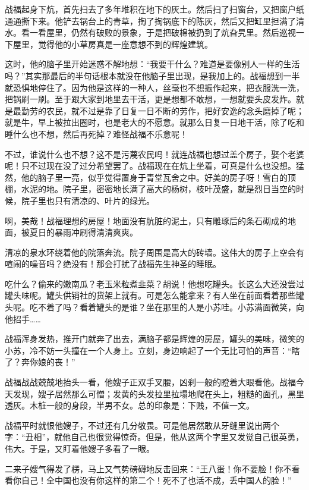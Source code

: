 战福起身下炕，首先扫去了多年堆积在地下的灰土。然后扫了扫窗台，又把窗户纸通通撕下来。他铲去锅台上的青草，掏了掏锅底下的陈灰，然后又把缸里担满了清水。看一看屋里，仍然有破败的景象，于是把破棉被扔到了炕旮旯里。然后巡视一下屋里，觉得他的小草房真是一座意想不到的辉煌建筑。 

这时，他的脑子里开始迷惑不解地想：“我要干什么？难道是要像别人一样的生活吗？”其实那最后的半句话根本就没在他脑子里出现，是我加上的。战福想到一半就恐惧地停住了。因为他是这样的一种人，丝毫也不想振作起来，把衣服洗一洗，把锅刷一刷。至于跟大家到地里去干活，更是想都不敢想，一想就要头皮发炸。就是最勤劳的农民，就不过是靠了日复一日不断的劳作，把好安逸的念头磨掉了呢；就是牛，早上被拉出圈时，也是老大的不愿意。就那么日复一日地干活，除了吃和睡什么也不想，然后再死掉？难怪战福不乐意呢！ 

不过，谁说什么也不想？这不是污蔑农民吗！就连战福也想过盖个房子，娶个老婆呢！只不过现在没了过分希望罢了。战福现在在炕上坐着，可真是什么也没想。猛然，他的脑子里一亮，似乎觉得置身于青堂瓦舍之中。好美的房子呀！雪白的顶棚，水泥的地。院子里，密密地长满了高大的杨树，枝叶茂盛，就是烈日当空的时候，院子里也只有清凉的、叶片的绿光。 

啊，美哉！战福理想的房屋！地面没有肮脏的泥土，只有雕琢后的条石砌成的地面，被夏日的暴雨冲刷得清清爽爽。 

清凉的泉水环绕着他的院落奔流。院子周围是高大的砖墙。这伟大的房子上空会有喧闹的噪音吗？绝没有！那会打扰了战福先生神圣的睡眠。 

吃什么？偷来的嫩南瓜？老玉米粒煮韭菜？胡说！他想吃罐头。长这么大还没尝过罐头味呢。罐头供销社的货架上就有。可是怎么能拿来？有人坐在前面看着那些罐头呢。吃不着了吗？看着罐头的是谁？坐在那里的人是小苏哇。小苏满面微笑，向他招手…… 

战福浑身发热，推开门就奔了出去，满脑子都是辉煌的房屋，罐头的美味，微笑的小苏，冷不妨一头撞在一个人身上。立刻，身边响起了一个无比可怕的声音：“瞎了？奔你娘的丧！” 

战福战战兢兢地抬头一看，他嫂子正双手叉腰，凶刹一般的瞪着大眼看他。战福今天发现，嫂子居然那么可憎；发黄的头发拉里拉塌地爬在头上，粗糙的面孔，黑里透灰。木桩一般的身段，半男不女。总的印象是：下贱，不值一文。 

战福平时就恨他嫂子，不过还有几分敬畏。可是他居然敢从牙缝里说出两个字：“丑相”，就他自己也很觉得惊奇。但是，他从这两个字里又发觉自己很英勇，伟大。于是，又盯着他嫂子多看了一眼。 

二来子嫂气得发了楞，马上又气势磅礴地反击回来：“王八蛋！你不要脸！你不看看你自己！全中国也没有你这样的第二个！死不了也活不成，丢中国人的脸！” 

